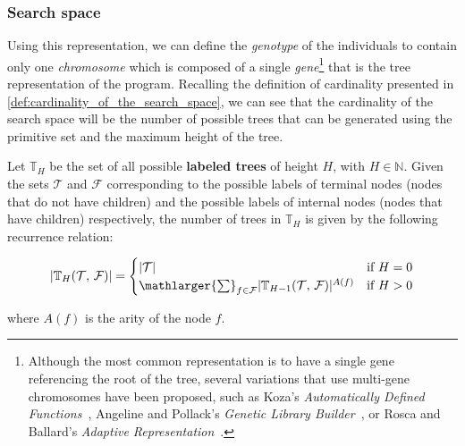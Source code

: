 \subsubsection{Search space}
\label{sec:bg:gp:repr_ev:space}
  Using this representation, we can define the \emph{genotype} of the
  individuals to contain only one \emph{chromosome} which is composed of a
  single \emph{gene}\footnote{%
    Although the most common representation is to have a single gene referencing
    the root of the tree, several variations that use multi-gene chromosomes
    have been proposed, such as Koza's \textit{Automatically Defined 
    Functions}~\autocite{kozaGeneticProgrammingII1994}, Angeline and Pollack's 
    \textit{Genetic Library Builder}~\autocite{peterjangelineEvolutionaryInductionSubroutines1992,peterj.angelineGeneticProgrammingEmergent1994},
    or Rosca and Ballard's \textit{Adaptive Representation}~\autocite{roscaLearningAdaptingRepresentations1994}.
  } that is the tree representation of the program.
  Recalling the definition of cardinality presented in
  \vref{def:cardinality_of_the_search_space}, we can see that the cardinality of
  the search space will be the number of possible trees that can be generated
  using the primitive set and the maximum height of the tree.

  \begin{lemma}
  \label{lemma:bg:gp:repr_ev:h_height_trees}
    Let \(\mathbb{T}_{H}\) be the set of all possible \textbf{labeled trees} of
    height \(H\), with \(H \in \mathbb{N}\).
    Given the sets \(\mathcal{T}\) and \(\mathcal{F}\) corresponding to the
    possible labels of terminal nodes (nodes that do not have children) and the
    possible labels of internal nodes (nodes that have children) respectively,
    the number of trees in \(\mathbb{T}_{H}\) is given by the following
    recurrence relation:

    \begin{equation}
      \label{eq:bg:gp:repr_ev:h_height_trees}
      |\mathbb{T}_{H}(\mathcal{T},\, \mathcal{F})| = \begin{cases}
        |\mathcal{T}| & \text{if } H = 0 \\
        \mathlarger{\sum}_{f \in \mathcal{F}} 
          |\mathbb{T}_{H-1}(\mathcal{T},\, \mathcal{F})|^{A(f)} 
          & \text{if } H > 0
      \end{cases}
    \end{equation}

    where \(A(f)\) is the arity of the node \(f\).
  \end{lemma}

